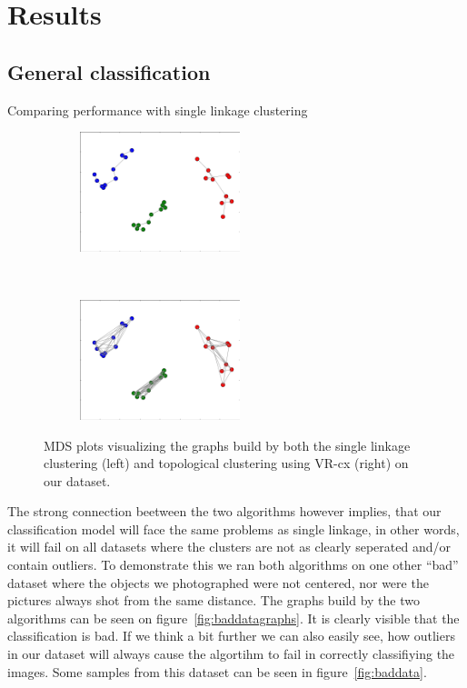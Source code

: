 \documentclass{article}
\newcommand{\enterProblemHeader}[1]{
}
\newcommand{\exitProblemHeader}[1]{
}
\newcounter{homeworkProblemCounter} %
\newcommand{\homeworkProblemName}{}
\newenvironment{homeworkProblem}[1][Problem \arabic{homeworkProblemCounter}]{ %
\stepcounter{homeworkProblemCounter} %
\renewcommand{\homeworkProblemName}{#1} %
\section{\homeworkProblemName} %
\enterProblemHeader{\homeworkProblemName} %
}{
\exitProblemHeader{\homeworkProblemName} %
}
\newcommand{\homeworkSectionName}{}
\newenvironment{homeworkSection}[1]{ %
\renewcommand{\homeworkSectionName}{#1} %
\subsection{\homeworkSectionName} %
\enterProblemHeader{\homeworkProblemName\ [\homeworkSectionName]} %
}{
\enterProblemHeader{\homeworkProblemName} %
}
\begin{document}
\begin{homeworkProblem}[Results]
\begin{homeworkSection}{General classification}
\begin{paragraph}{Comparing performance with single linkage clustering}
\begin{figure}[t]
    \centering
    \begin{subfigure}[t]{0.4\textwidth}
        \centering
        \includegraphics[height=3.5cm]{img/SL_classes}
    \end{subfigure}
   ~
    \begin{subfigure}[t]{0.4\textwidth}
        \centering
        \includegraphics[height=3.5cm]{img/TC_classes}
        \end{subfigure}
  \caption{MDS plots visualizing the graphs build by both the single linkage clustering (left) and topological clustering using VR-cx (right) on our dataset.}
  \label{fig:sltcgraphs}
\end{figure}

The strong connection beetween the two algorithms however implies, that our classification model will face the same problems as single linkage, in other words, it will fail on all datasets where the clusters are not as clearly seperated and/or contain outliers. To demonstrate this we ran both algorithms on one other ``bad'' dataset where the objects we photographed were not centered, nor were the pictures always shot from the same distance. The graphs build by the two algorithms can be seen on figure~\ref{fig:baddatagraphs}. It is clearly visible that the classification is bad. If we think a bit further we can also easily see, how outliers in our dataset will always cause the algortihm to fail in correctly classifiying the images. Some samples from this dataset can be seen in figure~\ref{fig:baddata}.


\end{paragraph}
\end{homeworkSection}
\end{homeworkProblem}
\end{document}
